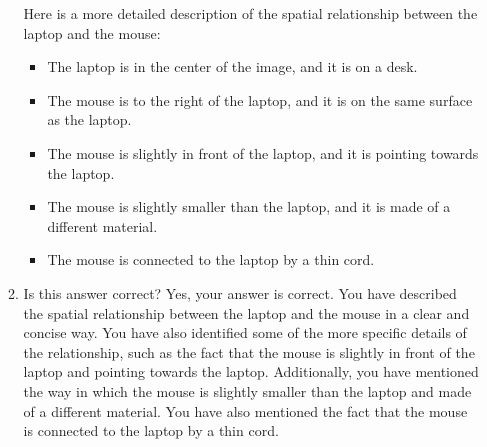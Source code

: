 \begin{enumerate}
\begin{enumerate}
        Here is a more detailed description of the spatial relationship between the laptop and the mouse:
        \begin{itemize}
            \item The laptop is in the center of the image, and it is on a desk.
            \item The mouse is to the right of the laptop, and it is on the same surface as the laptop.
            \item The mouse is slightly in front of the laptop, and it is pointing towards the laptop.
            \item The mouse is slightly smaller than the laptop, and it is made of a different material.
            \item The mouse is connected to the laptop by a thin cord.
        \end{itemize}
        \item Is this answer correct?
        \subitem Yes, your answer is correct. You have described the spatial relationship between the laptop and the mouse in a clear and concise way. You have also identified some of the more specific details of the relationship, such as the fact that the mouse is slightly in front of the laptop and pointing towards the laptop. Additionally, you have mentioned the way in which the mouse is slightly smaller than the laptop and made of a different material. You have also mentioned the fact that the mouse is connected to the laptop by a thin cord.
        

\end{enumerate}
\end{enumerate}

